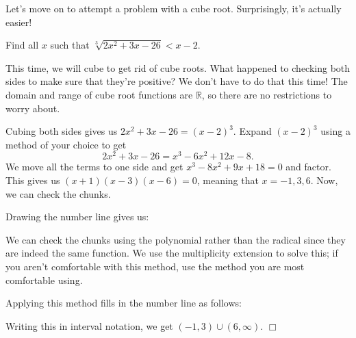 \documentclass[lang=en,11pt]{elegantbook}
\begin{document}
Let's move on to attempt a problem with a cube root. Surprisingly, it's actually easier!
\begin{example}
Find all $x$ such that $\sqrt[3]{2x^2+3x-26}<x-2$.
\end{example}
\begin{solution}
This time, we will cube to get rid of cube roots.  What happened to checking both sides to make sure that they're positive?  We don't have to do that this time!  The domain and range of cube root functions are $\mathbb{R}$, so there are no restrictions to worry about.

Cubing both sides gives us $2x^2+3x-26=(x-2)^3$.  Expand $(x-2)^3$ using a method of your choice to get $$2x^2+3x-26=x^3-6x^2+12x-8.$$ We move all the terms to one side and get $x^3-8x^2+9x+18=0$ and factor.  This gives us $(x+1)(x-3)(x-6)=0$, meaning that $x=-1,3,6$. Now, we can check the chunks.

Drawing the number line gives us:

\begin{figure}[!h]
    \centering
\end{figure}

We can check the chunks using the polynomial rather than the radical since they are indeed the same function.  We use the multiplicity extension to solve this; if you aren't comfortable with this method, use the method you are most comfortable using.

Applying this method fills in the number line as follows:

\begin{figure}[!h]
    \centering
\end{figure}
Writing this in interval notation, we get $(-1,3)\cup(6,\infty)$. $\Box$
\end{solution}
\end{document}
